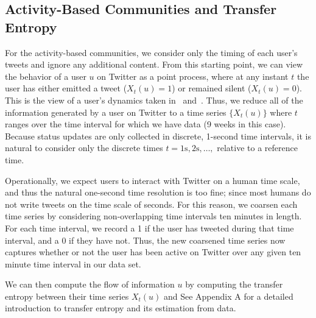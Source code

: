 \subsection{Activity-Based Communities and Transfer Entropy}
\label{sec:method-activity}

For the activity-based communities, we consider only the timing of each user's tweets and ignore any additional content. From this starting point, we can view the behavior of a user $u$ on Twitter as a point process, where at any instant $t$ the user has either emitted a tweet ($X_{t}(u) = 1$) or remained silent ($X_{t}(u) = 0$). This is the view of a user's dynamics taken in~\cite{darmon2013understanding} and~\cite{ver2012information}. Thus, we reduce all of the information generated by a user on Twitter to a time series $\{ X_{t}(u)\}$ where $t$ ranges over the time interval for which we have data (9 weeks in this case). Because status updates are only collected in discrete, 1-second time intervals, it is natural to consider only the discrete times $t = 1 \text{s}, 2 \text{s}, \ldots, $ relative to a reference time. 

Operationally, we expect users to interact with Twitter on a human time scale, and thus the natural one-second time resolution is too fine; since most humans do not write tweets on the time scale of seconds. For this reason, we coarsen each time series by considering non-overlapping time intervals ten minutes in length. For each time interval, we record a 1 if the user has tweeted during that time interval, and a 0 if they have not. Thus, the new coarsened time series now captures whether or not the user has been active on Twitter over any given ten minute time interval in our data set. \DIFaddbegin {}

\DIFaddend We can then compute the flow of information \DIFdelbegin {}\DIFdelend \DIFaddbegin {}\DIFaddend $u$ \DIFdelbegin {}\DIFdelend \DIFaddbegin {}\DIFaddend by computing the transfer entropy between their time series $X_{t}(u)$ and \DIFdelbegin {}\DIFdelend \DIFaddbegin {}\DIFaddend See Appendix A for a detailed introduction to transfer entropy and its estimation from data. \DIFdelbegin %


